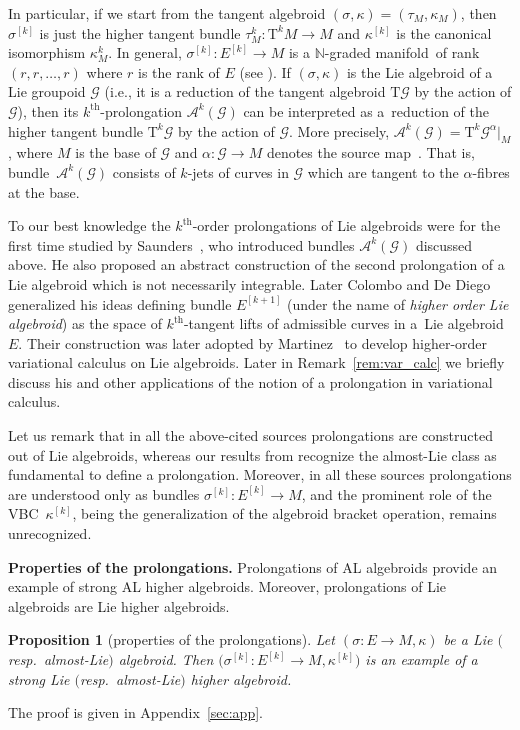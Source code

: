 \documentclass[10pt,a4paper]{amsart}
\newcommand{\grB}{{$\N$-graded manifold}}
\newcommand{\ZM}{{VBC}} %
\newcommand{\thh}[1]{#1^{\mathrm{th}}} %
\newcommand{\N}{\mathbb{N}}
\newcommand{\ra}{\rightarrow}
\newcommand{\A}{\mathcal{A}} %
\newcommand{\E}[1]{E^{[#1]}} %
\newcommand{\T}{\mathrm{T}} %
\newcommand{\TT}[1]{\mathrm{T}^{#1}} %
\newcommand{\G}{\mathcal{G}} %
\numberwithin{equation}{section}
\newtheorem{prop}[thm]{Proposition}
\theoremstyle{definition}
\begin{document}
In particular, if we start from the tangent algebroid $(\sigma,\kappa)=(\tau_M,\kappa_M)$, then $\sigma^{[k]}$ is just the higher tangent bundle $\tau^k_M\colon \TT{k}M\ra M$ and $\kappa^{[k]}$ is the canonical isomorphism $ \kappa^k_M$. In general, $\sigma^{[k]}\colon \E{k}\ra M$ is a \grB\ of rank $(r, r, \ldots, r)$ where $r$ is the rank of $E$ (see \cite[Theorem~4.5]{MJ_MR_models_high_alg_2015}). If $(\sigma, \kappa)$ is the Lie algebroid of a Lie groupoid $\mathcal{G}$ (i.e., it is a reduction of the tangent algebroid $\T\mathcal{G}$ by the action of $\mathcal{G}$), then its $\thh{k}$-prolongation $\A^k(\G)$ can be interpreted as a~reduction of the higher tangent bundle $\TT{k}\mathcal{G}$ by the action of $\G$. More precisely, $\A^k(\G) =\TT k \G^\alpha\big|_{M}$, where $M$ is the base of $\G$ and $\alpha\colon \G\ra M$ denotes the source map~\cite{MJ_MR_models_high_alg_2015}. That is, bundle~$\A^k(\G)$ consists of $k$-jets of curves in $\G$ which are tangent to the $\alpha$-fibres at the base.

To our best knowledge the $\thh{k}$-order prolongations of Lie algebroids were for the first time studied by Saunders~\cite{Saunders_2004}, who introduced bundles $\A^k(\G)$ discussed above. He also proposed an abstract construction of the second prolongation of a Lie algebroid which is not necessarily integrable. Later Colombo and De Diego~\cite{Col_deDiego_seminar_2011} generalized his ideas defining bundle $\E {k+1}$ (under the name of \emph{higher order Lie algebroid}) as the space of $\thh{k}$-tangent lifts of admissible curves in a~Lie algebroid $E$. Their construction was later adopted by Martinez~\cite{Martinez_2015} to develop higher-order variational calculus on Lie algebroids. Later in Remark~\ref{rem:var_calc} we briefly discuss his and other applications of the notion of a prolongation in variational calculus.

Let us remark that in all the above-cited sources prolongations are constructed out of Lie algebroids, whereas our results from \cite{MJ_MR_models_high_alg_2015} recognize the almost-Lie class as fundamental to define a prolongation. Moreover, in all these sources prolongations are understood only as bundles $\sigma^{[k]}\colon \E{k}\ra M$, and the prominent role of the \ZM\ $\kappa^{[k]}$, being the generalization of the algebroid bracket operation, remains unrecognized.

{\bf Properties of the prolongations.} Prolongations of AL algebroids provide an example of strong AL higher algebroids. Moreover, prolongations of Lie algebroids are Lie higher algebroids.
\begin{prop}[properties of the prolongations]\label{prop:E_k_as_AL_HA}
Let $(\sigma\colon E\ra M,\kappa)$ be a Lie $($resp.\ almost-Lie$)$ algebroid. Then $\big(\sigma^{[k]}\colon \E{k}\ra M, \kappa^{[k]}\big)$ is an example of a strong Lie $($resp.\ almost-Lie$)$ higher algebroid.
\end{prop}
The proof is given in Appendix~\ref{sec:app}.
\end{document}
